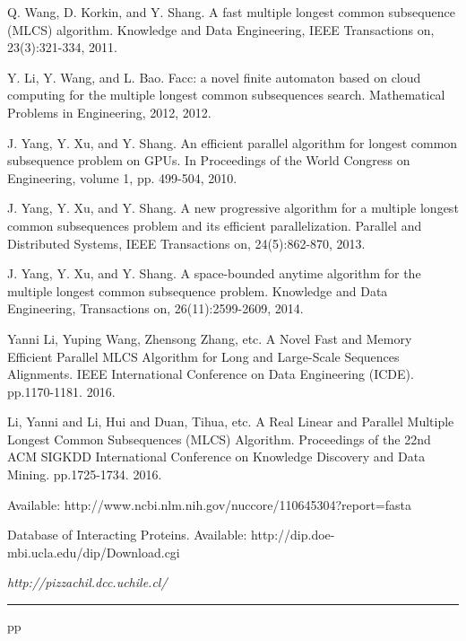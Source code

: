 \documentclass{article}
\begin{document}
\begin{thebibliography}{99}
 Q. Wang, D. Korkin, and Y. Shang. A fast multiple
longest common subsequence (MLCS) algorithm.  Knowledge and Data
Engineering, IEEE Transactions on, 23(3):321-334, 2011.

 Y. Li, Y. Wang, and L. Bao. Facc: a novel finite
  automaton based on cloud computing for the multiple longest common
  subsequences search. Mathematical Problems in Engineering, 2012,
  2012.

 J. Yang, Y. Xu, and Y. Shang. An efficient parallel
  algorithm for longest common subsequence problem on GPUs. In
  Proceedings of the World Congress on Engineering, volume 1, pp.
  499-504, 2010.

 J. Yang, Y. Xu, and Y. Shang. A new progressive
  algorithm for a multiple longest common subsequences problem and its
  efficient parallelization. Parallel and Distributed Systems, IEEE
  Transactions on, 24(5):862-870, 2013.

 J. Yang, Y. Xu, and Y. Shang. A space-bounded
  anytime algorithm for the multiple longest common subsequence
  problem. Knowledge and Data Engineering, Transactions on,
  26(11):2599-2609, 2014.

 Yanni Li, Yuping Wang, Zhensong Zhang, etc. A Novel
  Fast and Memory Efficient Parallel MLCS Algorithm for Long and
  Large-Scale Sequences Alignments.  IEEE International Conference on
  Data Engineering (ICDE). pp.1170-1181. 2016.

 Li, Yanni and Li, Hui and Duan, Tihua, etc. A Real
  Linear and Parallel Multiple Longest Common Subsequences (MLCS)
  Algorithm. Proceedings of the 22nd ACM SIGKDD International
  Conference on Knowledge Discovery and Data
  Mining. pp.1725-1734. 2016.

 Available:
  http://www.ncbi.nlm.nih.gov/nuccore/110645304?report=fasta

 Database of Interacting Proteins. Available:
  http://dip.doe-mbi.ucla.edu/dip/Download.cgi




 {\it http://pizzachil.dcc.uchile.cl/}

\end{thebibliography}  


\vspace*{-0.01in}
\noindent
\rule{12.6cm}{.1mm}
pp
\end{document}
